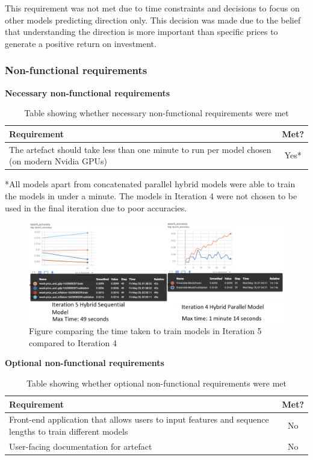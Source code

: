 This requirement was not met due to time constraints and decisions to focus on other models
predicting direction only. This decision was made due to the belief that understanding
the direction is more important than specific prices to generate a positive return on investment.

\subsubsection{Non-functional requirements}
\textbf{Necessary non-functional requirements}
\begin{table}[ht]
    \centering
    \begin{tabular}{|p{100mm}|c|}
        \hline
        Requirement & Met? \\
        \hline\hline
        The artefact should take less than one minute to run per model chosen (on modern Nvidia GPUs) & Yes* \\
        \hline
    \end{tabular}
    \caption{Table showing whether necessary non-functional requirements were met}
    \label{tab:necessary_non_functional_requirements}
\end{table}

*All models apart from concatenated parallel hybrid models were able to train the models in under a minute.
The models in Iteration 4 were not chosen to be used in the final iteration due to poor accuracies.
\begin{figure}[ht]
    \centering
    \includegraphics[width=0.95\columnwidth]{figures/time_taken.png}
    \caption[Time taken to train models]{Figure comparing the time taken to train models in Iteration 5 compared to Iteration 4}
    \label{fig:time_take_for_models}
\end{figure}
\FloatBarrier

\textbf{Optional non-functional requirements}
\begin{table}[ht]
    \centering
    \begin{tabular}{|p{100mm}|c|}
        \hline
        Requirement & Met? \\
        \hline\hline
        Front-end application that allows users to input features and sequence lengths to train different models & No \\
        User-facing documentation for artefact & No \\
        \hline
    \end{tabular}
    \caption{Table showing whether optional non-functional requirements were met}
    \label{tab:optional_non_functional_requirements}
\end{table}

